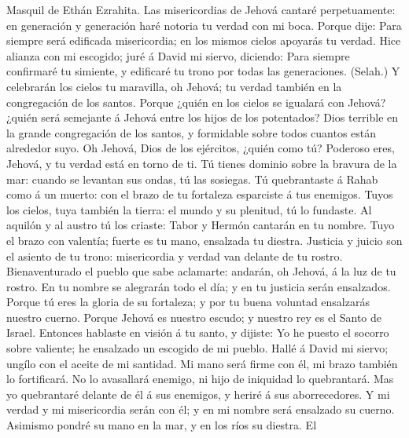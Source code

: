  Masquil de Ethán Ezrahita. Las misericordias de Jehová
cantaré perpetuamente: en generación y generación haré notoria tu verdad
con mi boca.  Porque dije: Para siempre será edificada
misericordia; en los mismos cielos apoyarás tu verdad. 
Hice alianza con mi escogido; juré á David mi siervo, diciendo:
 Para siempre confirmaré tu simiente, y edificaré tu trono
por todas las generaciones. (Selah.)  Y celebrarán los
cielos tu maravilla, oh Jehová; tu verdad también en la congregación de
los santos.  Porque ¿quién en los cielos se igualará con
Jehová? ¿quién será semejante á Jehová entre los hijos de los
potentados?  Dios terrible en la grande congregación de
los santos, y formidable sobre todos cuantos están alrededor suyo.
 Oh Jehová, Dios de los ejércitos, ¿quién como tú?
Poderoso eres, Jehová, y tu verdad está en torno de ti. 
Tú tienes dominio sobre la bravura de la mar: cuando se levantan sus
ondas, tú las sosiegas.  Tú quebrantaste á Rahab como á
un muerto: con el brazo de tu fortaleza esparciste á tus enemigos.
 Tuyos los cielos, tuya también la tierra: el mundo y su
plenitud, tú lo fundaste.  Al aquilón y al austro tú los
criaste: Tabor y Hermón cantarán en tu nombre.  Tuyo el
brazo con valentía; fuerte es tu mano, ensalzada tu diestra.
 Justicia y juicio son el asiento de tu trono:
misericordia y verdad van delante de tu rostro. 
Bienaventurado el pueblo que sabe aclamarte: andarán, oh Jehová, á la
luz de tu rostro.  En tu nombre se alegrarán todo el día;
y en tu justicia serán ensalzados.  Porque tú eres la
gloria de su fortaleza; y por tu buena voluntad ensalzarás nuestro
cuerno.  Porque Jehová es nuestro escudo; y nuestro rey
es el Santo de Israel.  Entonces hablaste en visión á tu
santo, y dijiste: Yo he puesto el socorro sobre valiente; he ensalzado
un escogido de mi pueblo.  Hallé á David mi siervo;
ungílo con el aceite de mi santidad.  Mi mano será firme
con él, mi brazo también lo fortificará.  No lo
avasallará enemigo, ni hijo de iniquidad lo quebrantará. 
Mas yo quebrantaré delante de él á sus enemigos, y heriré á sus
aborrecedores.  Y mi verdad y mi misericordia serán con
él; y en mi nombre será ensalzado su cuerno.  Asimismo
pondré su mano en la mar, y en los ríos su diestra.  El
